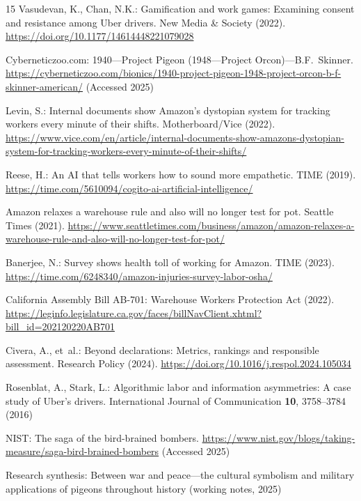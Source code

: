 \documentclass[runningheads]{llncs}
\begin{document}
\begin{thebibliography}{15}
Vasudevan, K., Chan, N.K.: Gamification and work games: Examining consent and
resistance among Uber drivers. New Media \& Society (2022).
\url{https://doi.org/10.1177/14614448221079028}

Cyberneticzoo.com: 1940---Project Pigeon (1948---Project Orcon)---B.F.~Skinner.
\url{https://cyberneticzoo.com/bionics/1940-project-pigeon-1948-project-orcon-b-f-skinner-american/}
(Accessed 2025)

Levin, S.: Internal documents show Amazon's dystopian system for tracking
workers every minute of their shifts. Motherboard/Vice (2022).
\url{https://www.vice.com/en/article/internal-documents-show-amazons-dystopian-system-for-tracking-workers-every-minute-of-their-shifts/}

Reese, H.: An AI that tells workers how to sound more empathetic.
TIME (2019). \url{https://time.com/5610094/cogito-ai-artificial-intelligence/}

Amazon relaxes a warehouse rule and also will no longer test for pot.
Seattle Times (2021).
\url{https://www.seattletimes.com/business/amazon/amazon-relaxes-a-warehouse-rule-and-also-will-no-longer-test-for-pot/}

Banerjee, N.: Survey shows health toll of working for Amazon. TIME (2023).
\url{https://time.com/6248340/amazon-injuries-survey-labor-osha/}

California Assembly Bill AB-701: Warehouse Workers Protection Act (2022).
\url{https://leginfo.legislature.ca.gov/faces/billNavClient.xhtml?bill_id=202120220AB701}

Civera, A., et~al.: Beyond declarations: Metrics, rankings and responsible
assessment. Research Policy (2024).
\url{https://doi.org/10.1016/j.respol.2024.105034}

Rosenblat, A., Stark, L.: Algorithmic labor and information asymmetries:
A case study of Uber's drivers. International Journal of Communication
\textbf{10}, 3758--3784 (2016)

NIST: The saga of the bird-brained bombers.
\url{https://www.nist.gov/blogs/taking-measure/saga-bird-brained-bombers}
(Accessed 2025)

Research synthesis: Between war and peace---the cultural symbolism and military
applications of pigeons throughout history (working notes, 2025)


\end{thebibliography}
\end{document}

